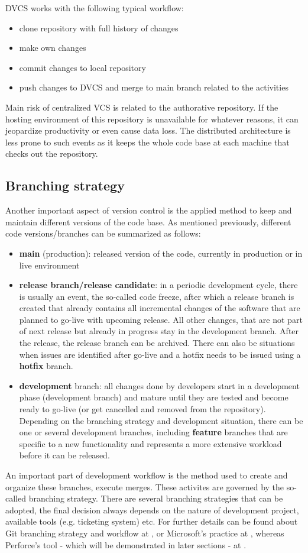 DVCS works with the following typical workflow:
\begin{itemize}
    \item clone repository with full history of changes
    \item make own changes
    \item commit changes to local repository
    \item push changes to DVCS and merge to main branch related to the activities
\end{itemize}
Main risk of centralized VCS is related to the authorative repository. If the hosting environment of this repository is
unavailable for whatever reasons, it can jeopardize productivity or even cause data loss. The distributed architecture
is less prone to such events as it keeps the whole code base at each machine that checks out the repository.
\subsection{Branching strategy}
Another important aspect of version control is the applied method to keep and maintain different versions of the code base.
As mentioned previously, different code versions/branches can be summarized as follows:
\begin{itemize}
    \item \textbf{main} (production): released version of the code, currently in production or in live environment
    \item \textbf{release branch/release candidate}: in a periodic development cycle, there is usually an event, the so-called 
    code freeze, after which a release branch is created that already contains all incremental changes of the software 
    that are planned to go-live with upcoming release. All other changes, that are not part of next release but already
    in progress stay in the development branch. After the release, the release branch can be archived. There can also
    be situations when issues are identified after go-live and a hotfix needs to be issued using a \textbf{hotfix} branch.
    \item \textbf{development} branch: all changes done by developers start in a development phase (development branch) 
    and mature until they are tested and become ready to go-live (or get cancelled and removed from the repository).
    Depending on the branching strategy and development situation, there can be one or several development branches,
    including \textbf{feature} branches that are specific to a new functionality and represents a more extensive workload before
    it can be released.
\end{itemize}
An important part of development workflow is the method used to create and organize these branches, execute merges. These
activites are governed by the so-called branching strategy. There are several branching strategies that can be adopted,
the final decision always depends on the nature of development project, available tools (e.g. ticketing system) etc.
For further details can be found about Git branching strategy and workflow at \cite{gitflow-workflow}, or Microsoft's
practice at \cite{ms-tfs-branching}, whereas Perforce's tool - which will be demonstrated in later sections - at 
\cite{perforce-branching}.
